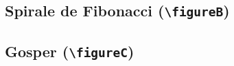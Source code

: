 \documentclass{poly}
\begin{document}
\subsection{Spirale de Fibonacci (\texttt{\textbackslash figureB})}
\figureB{}

\subsection{Gosper (\texttt{\textbackslash figureC})}
\figureC{}

\pagenotes
\end{document}
